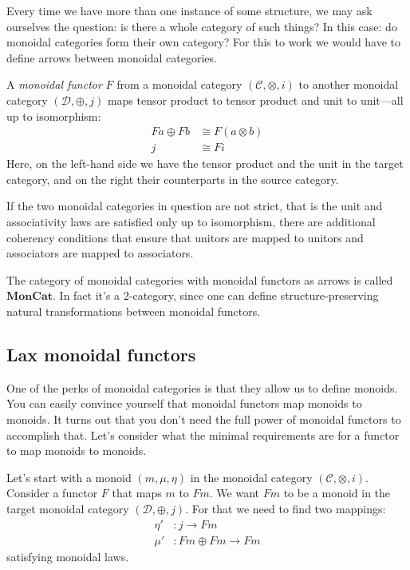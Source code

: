 \documentclass[DaoFP]{subfiles}
\begin{document}
Every time we have more than one instance of some structure, we may ask ourselves the question: is there a whole category of such things? In this case: do monoidal categories form their own category? For this to work we would have to define arrows between monoidal categories.

A \emph{monoidal functor} $F$ from a monoidal category $(\mathcal{C}, \otimes, i)$ to another monoidal category $(\mathcal{D}, \oplus, j)$ maps tensor product to tensor product and unit to unit---all up to isomorphism:
\begin{align*}
F a \oplus F b &\cong F (a \otimes b) \\
j &\cong F i 
\end{align*}
Here, on the left-hand side we have the tensor product and the unit in the target category, and on the right their counterparts in the source category. 

If the two monoidal categories in question are not strict, that is the unit and associativity laws are satisfied only up to isomorphism, there are additional coherency conditions that ensure that unitors are mapped to unitors and associators are mapped to associators.

The category of monoidal categories with monoidal functors as arrows is called $\mathbf{MonCat}$. In fact it's a 2-category, since one can define structure-preserving natural transformations between monoidal functors.

\subsection{Lax monoidal functors}

One of the perks of monoidal categories is that they allow us to define monoids. You can easily convince yourself that monoidal functors map monoids to monoids. It turns out that you don't need the full power of monoidal functors to accomplish that. Let's consider what the minimal requirements are  for a functor to map monoids to monoids. 

Let's start with a monoid $(m, \mu, \eta)$ in the monoidal category $(\mathcal{C}, \otimes, i)$. Consider a functor $F$ that maps $m$ to $F m$. We want $F m$ to be a monoid in the target monoidal category $(\mathcal{D}, \oplus, j)$. For that we need to find two mappings:
\begin{align*}
\eta' &\colon j \to F m \\
 \mu' &\colon F m \oplus F m \to F m 
\end{align*}
satisfying monoidal laws.
\end{document}
